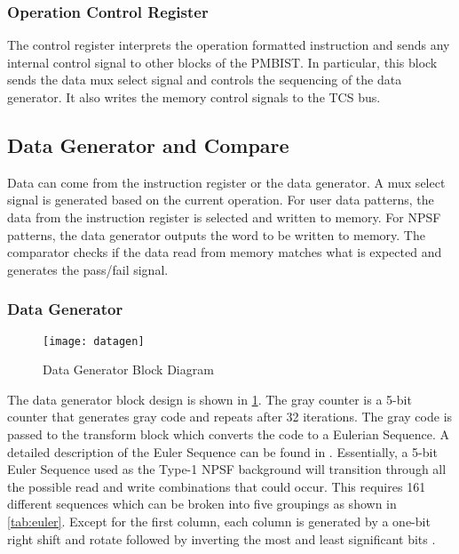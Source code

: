 \subsubsection{Operation Control Register}
The control register interprets the operation formatted instruction and sends any internal control signal to other blocks of the PMBIST.  In particular, this block sends the data mux select signal and controls the sequencing of the data generator.  It also writes the memory control signals to the TCS bus.  

\subsection{Data Generator and Compare}
Data can come from the instruction register or the data generator.  A mux select signal is generated based on the current operation.  For user data patterns, the data from the instruction register is selected and written to memory.  For NPSF patterns, the data generator outputs the word to be written to memory.  The comparator checks if the data read from memory matches what is expected and generates the pass/fail signal.

\subsubsection{Data Generator}
\begin{figure}[h!]
  \centering
  \texttt{[image: datagen]}
  \caption{Data Generator Block Diagram}
  \label{fig:datagen}
\end{figure}
The data generator block design is shown in \ref{fig:datagen}.  The gray counter is a 5-bit counter that generates gray code and repeats after 32 iterations.  The gray code is passed to the transform block which converts the code to a Eulerian Sequence.  A detailed description of the Euler Sequence can be found in \cite{1675556}.  Essentially, a 5-bit Euler Sequence used as the Type-1 NPSF background will transition through all the possible read and write combinations that could occur.  This requires 161 different sequences which can be broken into five groupings as shown in \ref{tab:euler}.  Except for the first column, each column is generated by a one-bit right shift and rotate followed by inverting the most and least significant bits \cite{00957583}.

